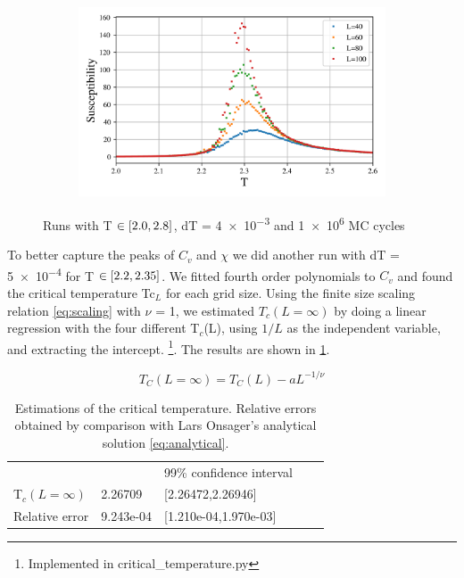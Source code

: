 \begin{figure}[ht]
\begin{subfigure}[t]{.5\textwidth}
    \caption{}
    \label{fig:sub-second}
  \end{subfigure}
  \begin{subfigure}[t]{.5\textwidth}
    \centering
    \includegraphics[width=\linewidth]{../figures/phase_suscept.png}
    \caption{}
    \label{fig:sub-second}
  \end{subfigure}
\caption{Runs with T $\in \left[2.0,2.8\right]$, dT = \num{4e-3} and
\num{1e6} MC cycles}
\label{fig:phase}
\end{figure}

To better capture the peaks of $C_v$ and $\chi$ we did another
run with dT = \num{5e-4} for T $\in \left[2.2, 2.35\right]$.
 We fitted fourth order polynomials to $C_v$ and found
the critical temperature Tc$_{L}$ for each grid size.
Using the finite size scaling relation
\cref{eq:scaling} with $\nu$ = 1, we estimated $T_c(L=\infty)$
by doing a linear
regression with the four different T$_c$(L), using $1/L$ as the independent
variable, and extracting the intercept.
\footnote{Implemented in critical\_temperature.py}. The results are shown in
\cref{tab:results}.

 \begin{equation}
   \label{eq:scaling}
   T_C(L=\infty) = T_C(L) - aL^{-1/\nu}
 \end{equation}




 \begin{table}[htp]
 \centering
 \begin{tabular}{|l|l|l|ll}
 \cline{1-3}
                &        & 99\% confidence interval  &  &  \\ \cline{1-3}
 T$_c(L=\infty)$          & 2.26709   & {[}2.26472,2.26946{]}     &  &  \\ \cline{1-3}
 Relative error & 9.243e-04 & {[}1.210e-04,1.970e-03{]} &  &  \\ \cline{1-3}
 \end{tabular}
 \caption{Estimations of the critical temperature. Relative errors obtained by
 comparison with Lars Onsager's analytical solution \cref{eq:analytical}.}
 \label{tab:results}
 \end{table}


